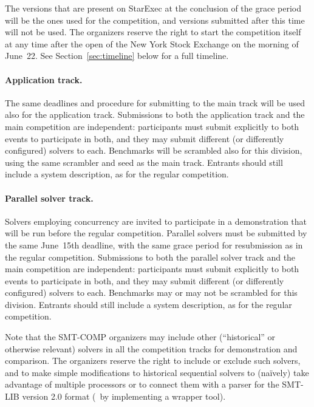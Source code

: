 \documentclass[12pt]{article}
\begin{document}
The versions that are present on StarExec at the conclusion of the
grace period will be the ones used for the competition, and versions
submitted after this time will not be used.  The organizers reserve
the right to start the competition itself at any time after the open
of the New York Stock Exchange on the morning of June~22.  See
Section~\ref{sec:timeline} below for a full timeline.

\paragraph{Application track.} %
The same deadlines and procedure for submitting to the main track will be used
also for the application track. Submissions to both the application track and
the main competition are independent: participants must submit explicitly to
both events to participate in both, and they may submit different (or
differently configured) solvers to each.  Benchmarks will be scrambled also
for this division, using the same scrambler and seed as the main track.
Entrants should still include a system description, as for the regular
competition.

\paragraph{Parallel solver track.} %
Solvers employing concurrency are invited to participate in a
demonstration that will be run before the regular competition.
Parallel solvers must be submitted by the same June~15th deadline,
with the same grace period for resubmission as in the regular
competition.  Submissions to both the parallel solver track
and the main competition are independent: participants must submit
explicitly to both events to participate in both, and they may submit
different (or differently configured) solvers to each.  Benchmarks may
or may not be scrambled for this division.  Entrants should still
include a system description, as for the regular competition.

\medskip
\noindent
Note that the SMT-COMP organizers may include
other (``historical'' or otherwise relevant) solvers in all the competition tracks for
demonstration and comparison.  The organizers reserve the right to
include or exclude such solvers, and to make simple modifications
to historical sequential solvers to (na\"ively) take advantage of
multiple processors 
or to connect them with a parser for the SMT-LIB version 2.0 format
(\eg\ by implementing a wrapper tool).
\end{document}
